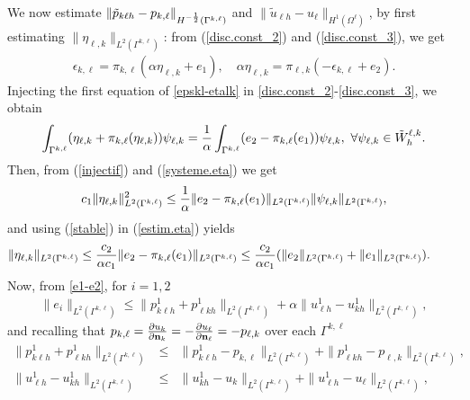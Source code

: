 \documentclass[final]{siamltex}
\begin{document}
We now estimate $\| \tilde{p}_{k \ell h} - p_{k,\ell} \|_{H^{-{1 \over
2}}(\Gamma^{k,\ell})}$ and $\| \tilde{u}_{\ell h} -
u_{\ell}\|_{H^1(\Omega^{\ell})}$, by first estimating $\|\eta_{\ell,k}
\|_{L^2(\Gamma^{k,\ell})}$:
from (\ref{disc.const_2}) and (\ref{disc.const_3}), we get
\begin{eqnarray}\label{epskl-etalk}
\epsilon_{k,\ell}=
\pi_{k,\ell}(\alpha \eta_{\ell,k} +e_1), \quad
\alpha \eta_{\ell,k}=
\pi_{\ell,k}(-\epsilon_{k,\ell} +e_2).
\end{eqnarray}
Injecting the first equation of \eqref{epskl-etalk} in \eqref{disc.const_2}-\eqref{disc.const_3}, we obtain
\begin{eqnarray}\label{systeme.eta}
\int_{\Gamma^{k,\ell}}(\eta_{\ell,k}+\pi_{k,\ell}(\eta_{\ell,k}))\psi_{\ell,k}
= {1 \over \alpha} \int_{\Gamma^{k,\ell}} (e_2 -
\pi_{k,\ell}(e_1))\psi_{\ell,k}
,\ \forall \psi_{\ell,k} \in \tilde W_h^{\ell,k}.
\end{eqnarray}
Then, from (\ref{injectif}) and (\ref{systeme.eta}) we get
\begin{eqnarray}\label{estim.eta}
c_1\|\eta_{\ell,k} \|_{L^2(\Gamma^{k,\ell})}^2
\le {1 \over \alpha} \|e_2 - \pi_{k,\ell}(e_1)\|_{L^2(\Gamma^{k,\ell})}
\|\psi_{\ell,k}\|_{L^2(\Gamma^{k,\ell})},
\end{eqnarray}
and using (\ref{stable}) in (\ref{estim.eta}) yields
\begin{eqnarray}\label{estim.eta2}
\|\eta_{\ell,k} \|_{L^2(\Gamma^{k,\ell})}
\le {c_2 \over \alpha c_1} \|e_2 - \pi_{k,\ell}(e_1)\|_{L^2(\Gamma^{k,\ell})}
\le {c_2 \over \alpha c_1} (\| e_2 \|_{L^2(\Gamma^{k,\ell})}
+\| e_1 \|_{L^2(\Gamma^{k,\ell})}).\qquad \
\end{eqnarray}
Now, from \eqref{e1-e2}, for $i=1,2$
\begin{eqnarray}
\|e_i \|_{L^2(\Gamma^{k,\ell})}
\le \|p_{k\ell h}^1+p_{\ell kh}^1\|_{L^2(\Gamma^{k,\ell})}
+\alpha \|u_{\ell h}^1-u_{kh}^1 \|_{L^2(\Gamma^{k,\ell})},
\nonumber
\end{eqnarray}
and recalling that $p_{k,\ell}=\frac{\partial u_k}{\partial {\bf n}_k}=
-\frac{\partial u_\ell}{\partial {\bf n}_{\ell}}=-p_{\ell,k}$ over each
$\Gamma^{k,\ell}$
\begin{eqnarray}
\|p_{k\ell h}^1+p_{\ell kh}^1\|_{L^2(\Gamma^{k,\ell})}
&\le& \|p_{k\ell h}^1-p_{k,\ell}\|_{L^2(\Gamma^{k,\ell})}
+\|p_{\ell k h}^1-p_{\ell,k}\|_{L^2(\Gamma^{k,\ell})},
\nonumber\\
\|u_{\ell h}^1-u_{kh}^1 \|_{L^2(\Gamma^{k,\ell})}
&\le& \|u_{k h}^1-u_k \|_{L^2(\Gamma^{k,\ell})}
+\|u_{\ell h}^1-u_{\ell} \|_{L^2(\Gamma^{k,\ell})},
\nonumber
\end{eqnarray}
\end{document}

